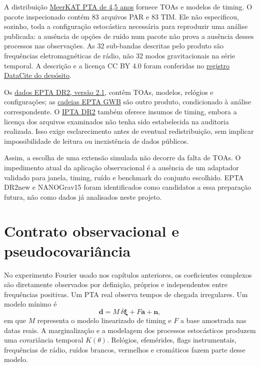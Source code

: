 A distribuição \href{https://docs.datacentral.org.au/meerkat-pulsar-timing-array/45-year/accessing-the-data/}{MeerKAT PTA de 4,5 anos} fornece TOAs e modelos de timing. O pacote inspecionado contém 83 arquivos PAR e 83 TIM. Ele não especificou, sozinho, toda a configuração estocástica necessária para reproduzir uma análise publicada: a ausência de opções de ruído num pacote não prova a ausência desses processos nas observações. As 32 sub-bandas descritas pelo produto são frequências eletromagnéticas de rádio, não 32 modos gravitacionais na série temporal. A descrição e a licença CC BY 4.0 foram conferidas no \href{https://api.datacite.org/dois/10.57891/j0vh-5g31}{registro DataCite do depósito}.

Os \href{https://zenodo.org/records/8300645}{dados EPTA DR2, versão 2.1}, contêm TOAs, modelos, relógios e configurações; as \href{https://zenodo.org/records/8091568}{cadeias EPTA GWB} são outro produto, condicionado à análise correspondente. O \href{https://ipta4gw.org/data-release/}{IPTA DR2} também oferece insumos de timing, embora a licença dos arquivos examinados não tenha sido estabelecida na auditoria realizada. Isso exige esclarecimento antes de eventual redistribuição, sem implicar impossibilidade de leitura ou inexistência de dados públicos.

Assim, a escolha de uma extensão simulada não decorre da falta de TOAs. O impedimento atual da aplicação observacional é a ausência de um adaptador validado para janela, timing, ruído e benchmark do conjunto escolhido. EPTA DR2new e NANOGrav15 foram identificados como candidatos a essa preparação futura, não como dados já analisados neste projeto.

\section{Contrato observacional e pseudocovariância}

No experimento Fourier usado nos capítulos anteriores, os coeficientes complexos são diretamente observados por definição, próprios e independentes entre frequências positivas. Um PTA real observa tempos de chegada irregulares. Um modelo mínimo é
\begin{equation}
 \boldsymbol d=M\,\delta\boldsymbol\xi+F\boldsymbol a+\boldsymbol n,
\end{equation}
em que $M$ representa o modelo linearizado de timing e $F$ a base amostrada nas datas reais. A marginalização e a modelagem dos processos estocásticos produzem uma covariância temporal $K(\theta)$. Relógios, efemérides, flags instrumentais, frequências de rádio, ruídos brancos, vermelhos e cromáticos fazem parte desse modelo.

